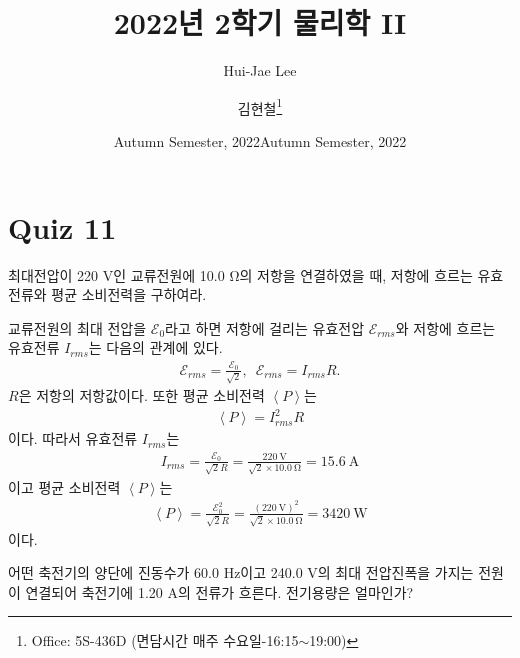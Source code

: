 \documentclass[tightenlines,floatfix,nofootinbib,superscriptaddress,fleqn]{revtex4}
\begin{document}
\title{\Large 2022년 2학기 물리학 II}

\author{Hui-Jae Lee} 
\date{Autumn Semester, 2022}

\author{김현철\footnote{Office: 5S-436D (면담시간 매주
    수요일-16:15$\sim$19:00)}} 
\date{Autumn Semester, 2022}

\maketitle



\section*{\large Quiz 11}
최대전압이 220 V인 교류전원에 10.0 $\mathrm{\Omega}$의 저항을 연결하였을 때,
저항에 흐르는 유효전류와 평균 소비전력을 구하여라.

교류전원의 최대 전압을 $\mathcal{E}_0$라고 하면 저항에 걸리는 유효전압 $\mathcal{E}_{rms}$와
저항에 흐르는 유효전류 $I_{rms}$는 다음의 관계에 있다.
\begin{align}
  \mathcal{E}_{rms} = \frac{\mathcal{E}_0}{\sqrt{2}},\,\,\,
  \mathcal{E}_{rms} = I_{rms}R.
\end{align}
$R$은 저항의 저항값이다. 또한 평균 소비전력 $\left<P\right>$는
\begin{align}
  \left<P\right> = I_{rms}^2R
\end{align}
이다. 따라서 유효전류 $I_{rms}$는
\begin{align}
  I_{rms} = \frac{\mathcal{E}_0}{\sqrt{2}R}=
  \frac{220~\mathrm{V}}{\sqrt{2}\times 10.0~\mathrm{\Omega}} = 15.6~\mathrm{A}
\end{align}
이고 평균 소비전력  $\left<P\right>$는
\begin{align}
  \left<P\right> = \frac{\mathcal{E}^2_0}{\sqrt{2}R}
  =\frac{(220~\mathrm{V})^2}{\sqrt{2}\times 10.0~\mathrm{\Omega}}
  =3420~\mathrm{W}
\end{align}
이다.
\vspace{1cm}

어떤 축전기의 양단에 진동수가 60.0 Hz이고 240.0 V의 최대 전압진폭을
가지는 전원이 연결되어 축전기에 1.20 A의 전류가 흐른다. 전기용량은 얼마인가?
\end{document}
